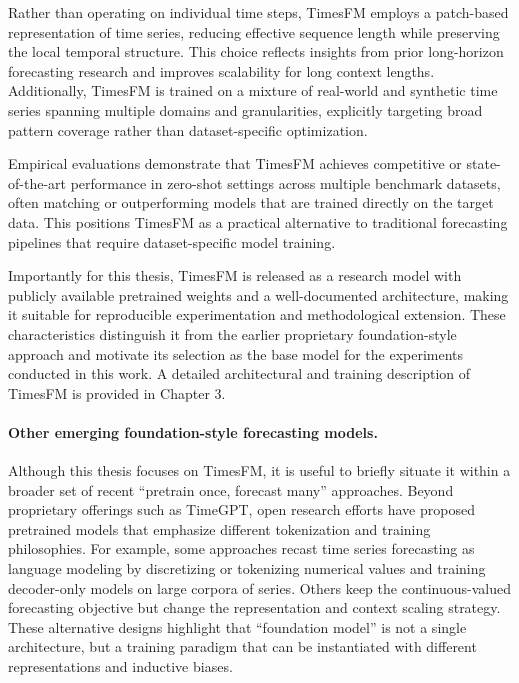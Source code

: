 Rather than operating on individual time steps, TimesFM employs a patch-based representation of time series, reducing effective sequence length while preserving the local temporal structure. This choice reflects insights from prior long-horizon forecasting research and improves scalability for long context lengths. Additionally, TimesFM is trained on a mixture of real-world and synthetic time series spanning multiple domains and granularities, explicitly targeting broad pattern coverage rather than dataset-specific optimization.

Empirical evaluations demonstrate that TimesFM achieves competitive or state-of-the-art performance in zero-shot settings across multiple benchmark datasets, often matching or outperforming models that are trained directly on the target data. This positions TimesFM as a practical alternative to traditional forecasting pipelines that require dataset-specific model training.

Importantly for this thesis, TimesFM is released as a research model with publicly available pretrained weights and a well-documented architecture, making it suitable for reproducible experimentation and methodological extension. These characteristics distinguish it from the earlier proprietary foundation-style approach and motivate its selection as the base model for the experiments conducted in this work. A detailed architectural and training description of TimesFM is provided in Chapter 3. 

\paragraph{Other emerging foundation-style forecasting models.}
Although this thesis focuses on TimesFM, it is useful to briefly situate it within a broader set of recent ``pretrain once, forecast many'' approaches. Beyond proprietary offerings such as TimeGPT, open research efforts have proposed pretrained models that emphasize different tokenization and training philosophies. For example, some approaches recast time series forecasting as language modeling by discretizing or tokenizing numerical values and training decoder-only models on large corpora of series. Others keep the continuous-valued forecasting objective but change the representation and context scaling strategy. These alternative designs highlight that ``foundation model'' is not a single architecture, but a training paradigm that can be instantiated with different representations and inductive biases.

